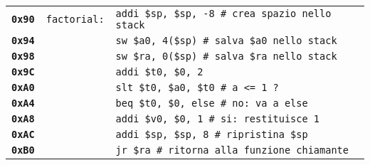 \documentclass[../main.tex]{subfiles}
\begin{document}
\begin{tabular}{ l l l }
    \textbf{\texttt{0x90}} & \texttt{factorial:} & \texttt{addi \$sp, \$sp, -8 \hspace*{0cm} \# crea spazio nello stack} \\
    \textbf{\texttt{0x94}} & & \texttt{sw \$a0, 4(\$sp) \hspace*{0cm} \hspace*{0cm} \hspace*{0cm} \hspace*{0cm} \# salva \$a0 nello stack} \\
    \textbf{\texttt{0x98}} & & \texttt{sw \$ra, 0(\$sp) \hspace*{0cm} \hspace*{0cm} \hspace*{0cm} \hspace*{0cm} \# salva \$ra nello stack} \\
    \textbf{\texttt{0x9C}} & & \texttt{addi \$t0, \$0, 2 } \\
    \textbf{\texttt{0xA0}} & & \texttt{slt \$t0, \$a0, \$t0 \hspace*{0cm} \# a <= 1 ?} \\
    \textbf{\texttt{0xA4}} & & \texttt{beq \$t0, \$0, else \hspace*{0cm} \# no:\hspace*{0cm} va a else} \\
    \textbf{\texttt{0xA8}} & & \texttt{addi \$v0, \$0, 1 \hspace*{0cm} \hspace*{0cm} \hspace*{0cm} \# si:\hspace*{0cm} restituisce 1} \\
    \textbf{\texttt{0xAC}} & & \texttt{addi \$sp, \$sp, 8 \hspace*{0cm} \hspace*{0cm} \# ripristina \$sp} \\
    \textbf{\texttt{0xB0}} & & \texttt{jr \$ra \hspace*{0cm} \hspace*{0cm} \hspace*{0cm} \hspace*{0cm} \hspace*{0cm} \hspace*{0cm} \hspace*{0cm} \hspace*{0cm} \hspace*{0cm} \hspace*{0cm} \hspace*{0cm} \hspace*{0cm} \# ritorna alla funzione chiamante} \\

\end{tabular}
\end{document}
